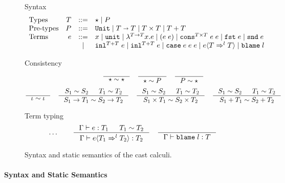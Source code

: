 \documentclass[acmsmall,review,anonymous]{acmart}\settopmatter{printfolios=true,printccs=false,printacmref=false}
\newcommand{\stxrule}[3]{\text{#2} & #1 & ::= & #3\\}
\newcommand{\stxrulecont}[1]{& & | & #1 \\}
\newcommand{\plus}[0]{+}
\newcommand{\judgetype}[3]{#1 \vdash #2 : #3}
\newcommand{\POOunit}[0]{\mathtt{Unit}}
\newcommand{\POOfun}[2]{#1 \shortrightarrow #2}
\newcommand{\POOprod}[2]{#1 \times #2}
\newcommand{\POOsum}[2]{#1 \plus #2}
\newcommand{\eOOvar}[1]{#1}
\newcommand{\eOOsole}[0]{\mathtt{unit}}
\newcommand{\eOOlam}[4]{\lambda^{#1\rightarrow{}#2}#3.#4}
\newcommand{\eOOapp}[2]{(#1 \; #2)}
\newcommand{\eOOcons}[4]{\mathtt{cons}^{\POOprod{#1}{#2}} \; #3 \; #4}
\newcommand{\eOOcar}[1]{\mathtt{fst} \; #1}
\newcommand{\eOOcdr}[1]{\mathtt{snd} \; #1}
\newcommand{\eOOinl}[3]{\mathtt{inl}^{\POOsum{#1}{#2}} \; #3}
\newcommand{\eOOcase}[3]{\mathtt{case} \; #1 \; #2 \; #3}
\newcommand{\eOOcast}[4]{#1 \langle \cOOcast{#2}{#3}{#4} \rangle}
\newcommand{\eOOblame}[1]{\mathtt{blame} \; #1}
\newcommand{\cOOcast}[3]{#1 \Rightarrow^{#2} #3}
\begin{document}
\begin{figure}
  Syntax
  \[
  \begin{array}{lrcl}
  \stxrule{T}{Types}{
    \star \mid{}
    P
  }
  \stxrule{P}{Pre-types}{
    \POOunit \mid
    \POOfun{T}{T} \mid
    \POOprod{T}{T} \mid
    \POOsum{T}{T}
  }
  \stxrule{e}{Terms}{
    \eOOvar{x} \mid{}
    \eOOsole{} \mid{}
    \eOOlam{T}{T}{x}{e} \mid
    \eOOapp{e}{e} \mid
    \eOOcons{T}{T}{e}{e} \mid
    \eOOcar{e} \mid
    \eOOcdr{e}
  }
  \stxrulecont{
    \eOOinl{T}{T}{e} \mid
    \eOOinl{T}{T}{e} \mid
    \eOOcase{e}{e}{e} \mid
    \eOOcast{e}{T}{l}{T} \mid
    \eOOblame{l}
  }
  \end{array}
  \]
  
  Consistency
  \begin{gather*}
  \inference{}{
    \star \sim \star
  } \quad
  \inference{}{
    \star \sim P
  } \quad
  \inference{}{
    P \sim \star
  } \\[1ex]
  \inference{}{
    \iota \sim \iota
  } \quad
  \inference{
    S_1 \sim S_2 &
    T_1 \sim T_2
  }{
    S_1 \rightarrow T_1 \sim S_2 \rightarrow T_2
  } \quad
  \inference{
    S_1 \sim S_2 &
    T_1 \sim T_2
  }{
    S_1 \times T_1 \sim S_2 \times T_2
  } \quad
  \inference{
    S_1 \sim S_2 &
    T_1 \sim T_2
  }{
    S_1 \plus T_1 \sim S_2 \plus T_2
  }
  \end{gather*}
  
  Term typing
  \fbox{$\judgetype{\Gamma}{e}{T}$}
  \begin{gather*}
          \dots \qquad
    \inference{
      \Gamma \vdash e : T_1 & T_1 \sim T_2
    }{
      \judgetype{\Gamma}{\eOOcast{e}{T_1}{l}{T_2}}{T_2}
    } \quad
    \inference{
    }{
      \judgetype{\Gamma}{\eOOblame{l}}{T}
    }
  \end{gather*}
  
  \caption{Syntax and static semantics of the cast calculi.}
  \label{fig:blame-static}
\end{figure}


\paragraph{Syntax and Static Semantics}
\end{document}
